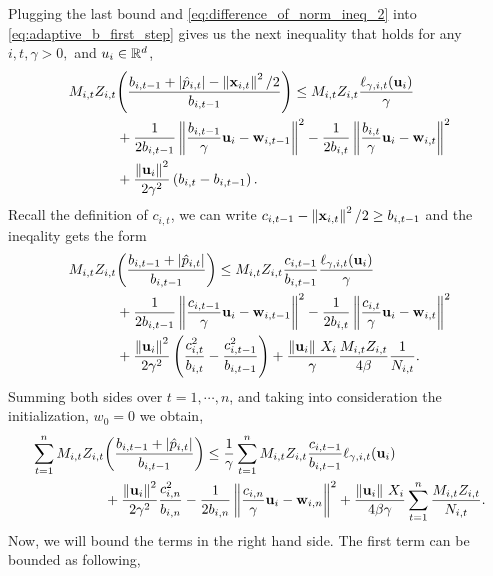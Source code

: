 {Plugging the  last bound and \eqref{eq:difference_of_norm_ineq_2} into \eqref{eq:adaptive_b_first_step} gives us the next inequality that holds for any $i,t,\gamma>0,$ and $u_i\in\mathbb{R}^d$,
\begin{equation*}
\begin{split}
M_{i,t}Z_{i,t}&{\left({\frac{b_{i,t-1} +\left\vert{\hat{p}_{i,t}}\right\vert-\left\Vert {\mathbf{x}_{i,t}} \right\Vert^2/2}{b_{i,t-1}}}\right)} \le M_{i,t}Z_{i,t}\frac{\ell_{\gamma,i,t}(\mathbf{u}_i)}{\gamma}\\
&+\frac{1}{2b_{i,t-1}}\left\Vert {\frac{b_{i,t-1}}{\gamma} \mathbf{u}_i-\mathbf{w}_{i,t-1}} \right\Vert^2-\frac{1}{2b_{i,t}}\left\Vert {\frac{b_{i,t}}{\gamma} \mathbf{u}_i-\mathbf{w}_{i,t}} \right\Vert^2\\
&+\frac{\left\Vert {\mathbf{u}_i} \right\Vert^2}{2\gamma^2}\left({b_{{i,t}}-b_{{i,t-1}}}\right)
.
\end{split}
\end{equation*}
Recall the definition of $c_{i,t}$, we can write $c_{i,t-1}-\left\Vert {\mathbf{x}_{i,t}} \right\Vert^2/2\ge b_{i,t-1}$ and the ineqality gets the form
\begin{equation*}
\begin{split}
M_{i,t}Z_{i,t}&{\left({\frac{b_{i,t-1} +\left\vert{\hat{p}_{i,t}}\right\vert}{b_{i,t-1}}}\right)} \le M_{i,t}Z_{i,t}\frac{c_{i,t-1}}{b_{i,t-1}}\frac{\ell_{\gamma,i,t}(\mathbf{u}_i)}{\gamma}\\
&+\frac{1}{2b_{i,t-1}}\left\Vert {\frac{c_{i,t-1}}{\gamma} \mathbf{u}_i-\mathbf{w}_{i,t-1}} \right\Vert^2-\frac{1}{2b_{i,t}}\left\Vert {\frac{c_{i,t}}{\gamma} \mathbf{u}_i-\mathbf{w}_{i,t}} \right\Vert^2\\
&+\frac{\left\Vert {\mathbf{u}_i} \right\Vert^2}{2\gamma^2}\left({\frac{c_{i,t}^2}{b_{i,t}}-\frac{c_{i,t-1}^2}{b_{i,t-1}}}\right)+
\frac{\Vert\mathbf{u}_i\Vert~ X_i}{\gamma}\frac{M_{i,t}Z_{i,t}}{4\beta}\frac{1}{N_{i,t}}.
\end{split}
\end{equation*}
Summing  both sides over $t=1,\cdots,n$, and taking into consideration the initialization,   $w_0=0$ we obtain,
\begin{equation}
\begin{split}
\sum_{t=1}^{n}M_{i,t}Z_{i,t}&{\left({\frac{b_{i,t-1} +\left\vert{\hat{p}_{i,t}}\right\vert}{b_{i,t-1}}}\right)} \le \frac{1}{\gamma}\sum_{t=1}^{n}{M_{i,t}Z_{i,t}\frac{c_{i,t-1}}{b_{i,t-1}}\ell_{\gamma,i,t}(\mathbf{u}_i)}\\
&+\frac{\left\Vert {\mathbf{u}_i} \right\Vert^2}{2\gamma^2}\frac{c_{i,n}^2}{b_{i,n}}-\frac{1}{2b_{i,n}}\left\Vert {\frac{c_{i,n}}{\gamma} \mathbf{u}_i-\mathbf{w}_{i,n}} \right\Vert^2
+\frac{\Vert\mathbf{u}_i\Vert~ X_i}{4\beta\gamma}\sum_{t=1}^{n}{\frac{M_{i,t}Z_{i,t}}{N_{i,t}}}.
\label{eq:first_sum}
\end{split}
\end{equation}
Now, we will bound the terms in the right hand side. The first term can be bounded as following,
}
